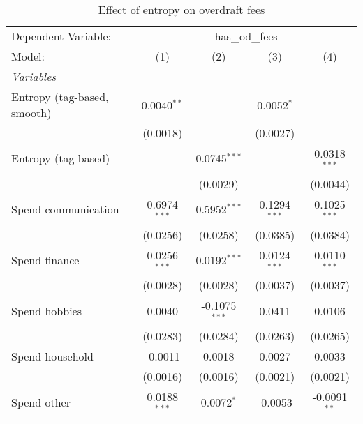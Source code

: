 
\begin{table}[htbp]
   \centering
   \caption{\label{tab:reg_entropy_odfees} Effect of entropy on overdraft fees}
   \begin{scriptsize}
      \begin{tabular}{lcccc}
         \tabularnewline\midrule\midrule
         Dependent Variable: & \multicolumn{4}{c}{has\_od\_fees}\\
         Model:                      & (1)                     & (2)                     & (3)            & (4)\\
         \midrule \emph{Variables} &   &   &   &  \\
         Entropy (tag-based, smooth) & 0.0040$^{**}$           &                         & 0.0052$^{*}$   &   \\
                                     & (0.0018)                &                         & (0.0027)       &   \\
         Entropy (tag-based)         &                         & 0.0745$^{***}$          &                & 0.0318$^{***}$\\
                                     &                         & (0.0029)                &                & (0.0044)\\
         Spend communication         & 0.6974$^{***}$          & 0.5952$^{***}$          & 0.1294$^{***}$ & 0.1025$^{***}$\\
                                     & (0.0256)                & (0.0258)                & (0.0385)       & (0.0384)\\
         Spend finance               & 0.0256$^{***}$          & 0.0192$^{***}$          & 0.0124$^{***}$ & 0.0110$^{***}$\\
                                     & (0.0028)                & (0.0028)                & (0.0037)       & (0.0037)\\
         Spend hobbies               & 0.0040                  & -0.1075$^{***}$         & 0.0411         & 0.0106\\
                                     & (0.0283)                & (0.0284)                & (0.0263)       & (0.0265)\\
         Spend household             & -0.0011                 & 0.0018                  & 0.0027         & 0.0033\\
                                     & (0.0016)                & (0.0016)                & (0.0021)       & (0.0021)\\
         Spend other                 & 0.0188$^{***}$          & 0.0072$^{*}$            & -0.0053        & -0.0091$^{**}$\\

\end{tabular}
\end{scriptsize}
\end{table}
